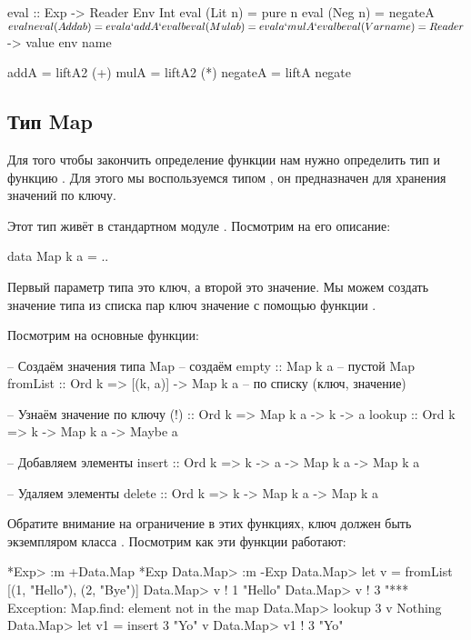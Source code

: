 \begin{code}
eval :: Exp -> Reader Env Int
eval (Lit n)    = pure n
eval (Neg n)    = negateA $ eval n
eval (Add a b)  = eval a `addA` eval b
eval (Mul a b)  = eval a `mulA` eval b
eval (Var name) = Reader $ \env -> value env name    
   
addA      = liftA2 (+)
mulA      = liftA2 (*)  
negateA   = liftA negate  
\end{code}

\subsection{Тип Map}

Для того чтобы закончить определение функции 
нам нужно определить тип  и функцию .
Для этого мы воспользуемся типом , он предназначен
для хранения значений по ключу. 

Этот тип живёт в стандартном модуле . 
Посмотрим на его описание:

\begin{code}
data Map k a = ..
\end{code}

Первый параметр типа  это ключ, а второй это значение.
Мы можем создать значение типа  из списка пар
ключ значение с помощью функции .

Посмотрим на основные функции:

\begin{code}
-- Создаём значения типа Map                    -- создаём  
empty :: Map k a                                -- пустой Map
fromList :: Ord k => [(k, a)] -> Map k a        -- по списку (ключ, значение)

-- Узнаём значение по ключу
(!)     :: Ord k => Map k a -> k -> a           
lookup  :: Ord k => k -> Map k a -> Maybe a

-- Добавляем элементы
insert :: Ord k => k -> a -> Map k a -> Map k a

-- Удаляем элементы
delete :: Ord k => k -> Map k a -> Map k a
\end{code}

Обратите внимание на ограничение  в этих функциях,
ключ должен быть экземпляром класса .
Посмотрим как эти функции работают:

\begin{code}
*Exp> :m +Data.Map
*Exp Data.Map> :m -Exp
Data.Map> let v = fromList [(1, "Hello"), (2, "Bye")]
Data.Map> v ! 1
"Hello"
Data.Map> v ! 3
"*** Exception: Map.find: element not in the map
Data.Map> lookup 3 v
Nothing
Data.Map> let v1 = insert 3 "Yo" v
Data.Map> v1 ! 3
"Yo"
\end{code}

